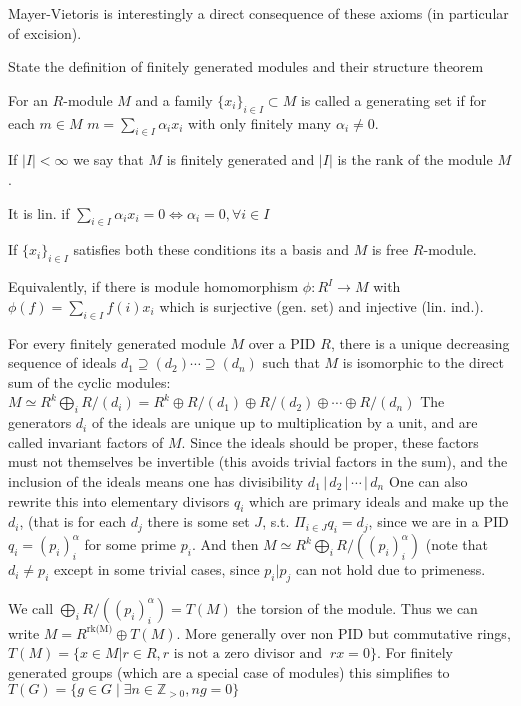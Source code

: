 Mayer-Vietoris is interestingly a direct consequence of these axioms (in particular of excision).

State the definition of finitely generated modules
and their structure theorem

For an \(R\)-module \(M\) and a family \(\{x_i\}_{i \in I} \subset M\)
is called a generating set if for each \(m \in M\)
\(m = \sum_{i \in I} \alpha_i x_i\) with only finitely many \(\alpha_i \neq 0\).

If \(|I| < \infty\) we say that \(M\) is finitely generated and \( |I| \) is the rank of the module \( M \).

It is lin. if
\(\sum_{i \in I} \alpha_i x_i = 0 \iff \alpha_i = 0, \forall i \in I\)

If \(\{x_i\}_{i \in I}\) satisfies both these conditions its a basis
and \(M\) is free \(R\)-module.

Equivalently, if there is module homomorphism \( \phi : R^{I} \to M\) with \(\phi(f) = \sum_{i \in I} f(i) x_i\)
which is surjective (gen. set) and injective (lin. ind.).

For every finitely generated module \( M \) over a PID \( R \), there is a unique decreasing sequence of 
ideals \( d_1 \supseteq(d_2) \cdots\supseteq(d_n)\)  such that \( M \) is isomorphic to the direct sum of the cyclic modules:
\( M \simeq R^k \bigoplus_i R/(d_i) = R^k \oplus R/(d_1)\oplus R/(d_2)\oplus\cdots\oplus R/(d_n) \)
The generators \( d_i \) of the ideals are unique up to multiplication by a unit, and are called invariant factors of \( M \). 
Since the ideals should be proper, these factors must not themselves be invertible (this avoids trivial factors in the sum), 
and the inclusion of the ideals means one has divisibility \( d_1\,|\,d_2\,|\,\cdots\,|\,d_n \)
One can also rewrite this into elementary divisors \( q_i \) which are primary ideals and make up the \( d_i \), 
(that is for each \( d_j \) there is some set \( J \), s.t. \( \Pi_{i \in J} q_i = d_j \),
since we are in a PID \( q_i = (p_i)^\alpha_i \) for some prime \( p_i \).
And then 
\( M \simeq R^k \bigoplus_i R/((p_i)^\alpha_i) \)
(note that \( d_i \neq p_i \) except in some trivial cases, since \( p_i | p_j \) can not hold due to primeness.

We call \( \bigoplus_i R/((p_i)^\alpha_i) = T(M) \) the torsion of the module.
Thus we can write \( M = R^\text{rk(M)} \oplus T(M) \).
More generally over non PID but commutative rings, \( T(M) = \{x \in M|r \in R,r\text{ is not a zero divisor and }\ rx = 0 \} \).
For finitely generated groups (which are a special case of modules) this simplifies to 
\( T(G) = \{g \in G \mid \exists n \in \mathbb{Z}_{>0}, ng = 0\} \)


